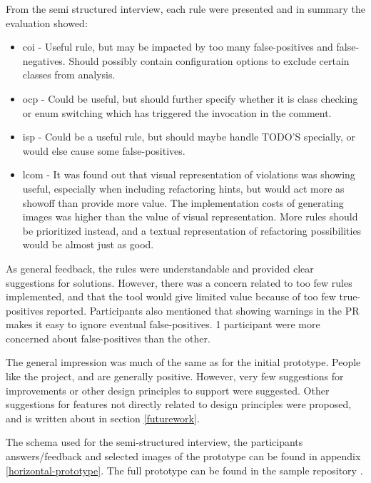 \documentclass{report}
\begin{document}
From the semi structured interview, each rule were presented and in summary the evaluation showed:
\begin{itemize}
    \item \gls{coi} - Useful rule, but may be impacted by too many false-positives and false-negatives. Should possibly contain configuration options to exclude certain classes from analysis.
\item \gls{ocp} - Could be useful, but should further specify whether it is class checking or enum switching which has triggered the invocation in the comment. 
\item \gls{isp} - Could be a useful rule, but should maybe handle TODO'S specially, or would else cause some false-positives.
\item \gls{lcom} - It was found out that visual representation of violations was showing useful, especially when including refactoring hints, but would act more as showoff than provide more value. The implementation costs of generating images was higher than the value of visual representation. More rules should be prioritized instead, and a textual representation of refactoring possibilities would be almost just as good.
\end{itemize}

As general feedback, the rules were understandable and provided clear suggestions for solutions. However, there was a concern related to too few rules implemented, and that the tool would give limited value because of too few true-positives reported. Participants also mentioned that showing warnings in the PR makes it easy to ignore eventual false-positives. 1 participant were more concerned about false-positives than the other.

The general impression was much of the same as for the initial prototype. People like the project, and are generally positive. However, very few suggestions for improvements or other design principles to support were suggested. Other suggestions for features not directly related to design principles were proposed, and is written about in section \ref{futurework}.

The schema used for the semi-structured interview, the participants answers/feedback and selected images of the prototype can be found in appendix \ref{horizontal-prototype}. The full prototype can be found in the sample repository \cite{sample-repository}. 
\end{document}
